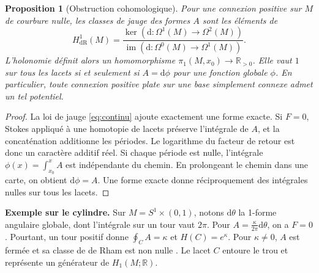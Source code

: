 \documentclass[11pt,a4paper]{article}
\theoremstyle{clair}
\newtheorem{proposition}{Proposition}[section]
\newcommand{\R}{\mathbb{R}}
\newcommand{\dd}{\mathrm{d}}
\begin{document}
\begin{proposition}[Obstruction cohomologique]
\label{prop:periods}
Pour une connexion positive sur \(M\) de courbure nulle, les classes de jauge des formes \(A\) sont les éléments de
\[
 H^1_{\mathrm{dR}}(M)
 = \frac{\ker(\dd\colon\Omega^1(M)\to\Omega^2(M))}
        {\operatorname{im}(\dd\colon\Omega^0(M)\to\Omega^1(M))}.
\]
L'holonomie définit alors un homomorphisme \(\pi_1(M,x_0)\to\R_{>0}\). Elle vaut \(1\) sur tous les lacets si et seulement si \(A=\dd\phi\) pour une fonction globale \(\phi\). En particulier, toute connexion positive plate sur une base simplement connexe admet un tel potentiel.
\end{proposition}

\begin{proof}
La loi de jauge \eqref{eq:continu} ajoute exactement une forme exacte. Si \(F=0\), Stokes appliqué à une homotopie de lacets préserve l'intégrale de \(A\), et la concaténation additionne les périodes. Le logarithme du facteur de retour est donc un caractère additif réel. Si chaque période est nulle, l'intégrale \(\phi(x)=\int_{x_0}^x A\) est indépendante du chemin. En prolongeant le chemin dans une carte, on obtient \(\dd\phi=A\). Une forme exacte donne réciproquement des intégrales nulles sur tous les lacets.
\end{proof}

\begin{minipage}[c]{0.62\linewidth}
\textbf{Exemple sur le cylindre.} Sur \(M=S^1\times(0,1)\), notons \(\dd\theta\) la 1-forme angulaire globale, dont l'intégrale sur un tour vaut \(2\pi\). Pour \(A=\frac{\kappa}{2\pi}\dd\theta\), on a \(F=0\). Pourtant, un tour positif donne \(\oint_C A=\kappa\) et \(H(C)=e^\kappa\). Pour \(\kappa\ne0\), \(A\) est fermée et sa classe de de Rham est non nulle \cite{botttu,nakahara}. Le lacet \(C\) entoure le trou et représente un générateur de \(H_1(M;\R)\).
\end{minipage}\hfill
\begin{minipage}[c]{0.34\linewidth}
\centering
{}
\end{minipage}
\end{document}
